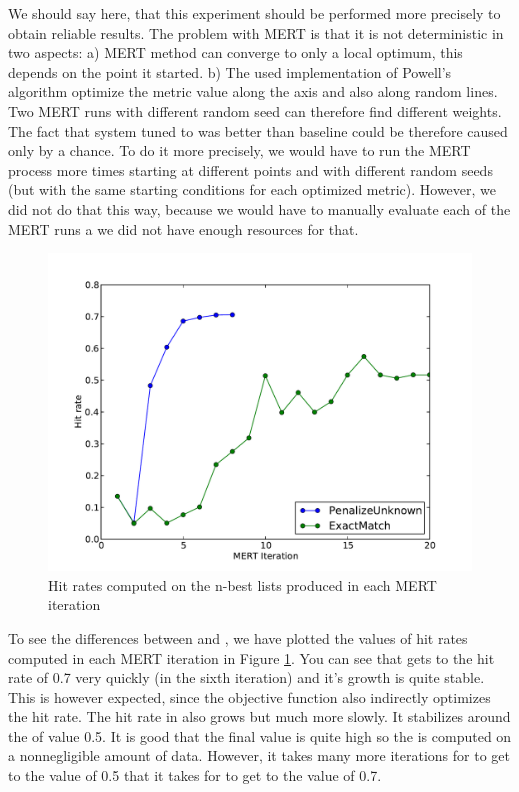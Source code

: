 We should say here, that this experiment should be performed more precisely to
obtain reliable results. The problem with MERT is that it is not
deterministic in two aspects: a) MERT method can converge to only a local
optimum, this depends on the point it started. b) The used implementation of
Powell's algorithm optimize the metric value along the axis and also along
random lines. Two MERT runs with different random seed can therefore find
different weights. The fact that system tuned to  was
better than baseline could be therefore caused only by a chance. To do it more
precisely, we would have to run the MERT process more times starting at
different points and with different random seeds (but with the same starting
conditions for each optimized metric). However, we did not do that this way,
because we would have to manually evaluate each of the MERT runs a we did not
have enough resources for that.





\begin{figure}
    \begin{center}
        \includegraphics[width=12cm]{img/hit-rates-plot.pdf}
    \end{center}

    \caption[Hit rates computed on the n-best lists produced in MERT]{Hit rates
    computed on the n-best lists produced in each MERT iteration}

    \label{hit:rates:plot}
\end{figure}


To see the differences between  and
, we have plotted the values of hit rates computed in
each MERT iteration in Figure \ref{hit:rates:plot}. You can see that
 gets to the hit rate of 0.7 very quickly (in the sixth
iteration) and it's growth is quite stable. This is however expected, since the
objective function also indirectly optimizes the hit rate. The hit rate in
 also grows but much more slowly. It stabilizes around the of
value 0.5. It is good that the final value is quite high so the
 is computed on a nonnegligible amount of data. However, it
takes many more iterations for  to get to the value of 0.5 that
it takes for  to get to the value of 0.7. 

